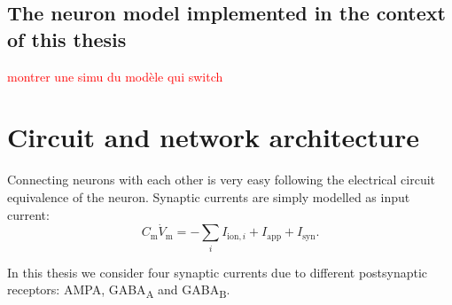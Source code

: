 \color{black}
\subsection{The neuron model implemented in the context of this thesis}

\textcolor{red}{montrer une simu du modèle qui switch}

%
%

\section{Circuit and network architecture}
Connecting neurons with each other is very easy following the electrical circuit equivalence of the neuron. Synaptic currents are simply modelled as input current:
$$ C_\mathrm{m}\dot{V}_\mathrm{m} = -\sum_i I_{\mathrm{ion},i} + I_{\mathrm{app}} + I_{\mathrm{syn}}.$$ 

In this thesis we consider four synaptic currents due to different postsynaptic receptors: \acrshort{AMPA}, \acrshort{GABA}\textsubscript{A} and \acrshort{GABA}\textsubscript{B}.

